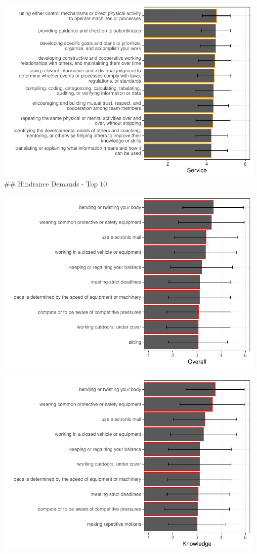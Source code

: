 \documentclass[
  english,
  man]{apa6}
\begin{document}
\includegraphics{SIOPjdr2_files/figure-latex/unnamed-chunk-6-1.pdf}
\#\# Hindrance Demands - Top 10

\includegraphics{SIOPjdr2_files/figure-latex/unnamed-chunk-7-1.pdf}

\includegraphics{SIOPjdr2_files/figure-latex/unnamed-chunk-8-1.pdf}
\end{document}
